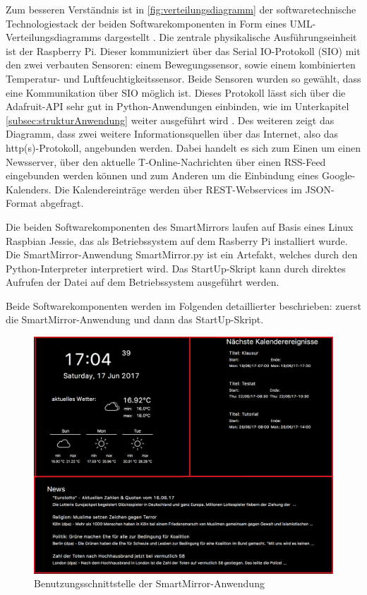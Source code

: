 Zum besseren Verständnis ist in \autoref{fig:verteilungsdiagramm} der softwaretechnische Technologiestack der beiden Softwarekomponenten in Form eines UML-Verteilungsdiagramms dargestellt \cite{booch1999uml}. Die zentrale physikalische Ausführungseinheit ist der Raspberry Pi. Dieser kommuniziert über das Serial IO-Protokoll (SIO) mit den zwei verbauten Sensoren: einem Bewegungssensor, sowie einem kombinierten Temperatur- und Luftfeuchtigkeitssensor. Beide Sensoren wurden so gewählt, dass eine Kommunikation über SIO möglich ist. Dieses Protokoll lässt sich über die Adafruit-API sehr gut in Python-Anwendungen einbinden, wie im Unterkapitel \autoref{subsec:strukturAnwendung} weiter ausgeführt wird \cite{adafruit2017}. Des weiteren zeigt das Diagramm, dass zwei weitere Informationsquellen über das Internet, also das http(s)-Protokoll, angebunden werden. Dabei handelt es sich zum Einen um  
einen Newsserver, über den aktuelle T-Online-Nachrichten über einen RSS-Feed eingebunden werden können und zum Anderen um die Einbindung eines Google-Kalenders\cite{feedparserLib}\cite{vayssiere2004system}. Die Kalendereinträge werden über  REST-Webservices im JSON-Format abgefragt\cite{bricalliweb}\cite{bray2014javascript}. 

Die beiden Softwarekomponenten des SmartMirrors laufen auf Basis eines Linux Raspbian Jessie, das als Betriebssystem auf dem Rasberry Pi installiert wurde. Die SmartMirror-Anwendung \glqq SmartMirror.py \grqq ist ein Artefakt, welches durch den Python-Interpreter interpretiert wird. Das StartUp-Skript kann durch direktes Aufrufen der Datei auf dem Betriebssystem ausgeführt werden. 

Beide Softwarekomponenten werden im Folgenden detaillierter beschrieben: zuerst die SmartMirror-Anwendung und dann das StartUp-Skript.

\begin{figure}
	\centering
	\includegraphics[width=0.8\linewidth]{bilder/grafOberflaeche}
	\caption[Benutzungsschnittstelle der SmartMirror-Anwendung]{Benutzungsschnittstelle der SmartMirror-Anwendung}
	\label{fig:grafoberflaeche}
\end{figure}


